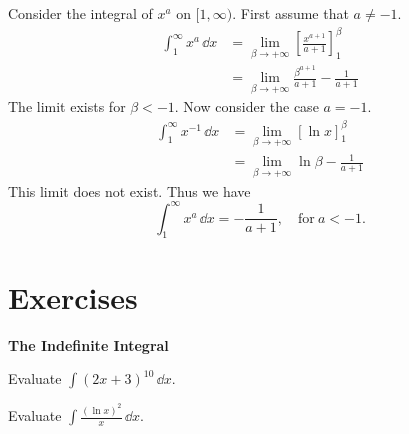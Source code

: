 \begin{Example}
  Consider the integral of $x^a$ on $[1,\infty)$.  First assume that
  $a \neq -1$.
  \begin{align*}
    \int_1^\infty x^a \,\dd x
    &= \lim_{\beta \to +\infty} \left[ \frac{x^{a+1}}{a+1} 
    \right]_1^\beta \\
    &= \lim_{\beta \to +\infty} \frac{\beta^{a+1}}{a+1} - \frac{1}{a+1}
  \end{align*}
  The limit exists for $\beta < -1$.  Now consider the case $a = -1$.
  \begin{align*}
    \int_1^\infty x^{-1} \,\dd x
    &= \lim_{\beta \to +\infty} \left[ \ln x
    \right]_1^\beta \\
    &= \lim_{\beta \to +\infty} \ln \beta - \frac{1}{a+1}
  \end{align*}
  This limit does not exist.  Thus we have 
  \[
  \int_1^\infty x^a \,\dd x = - \frac{1}{a+1}, \quad \mathrm{for}\ a < -1.
  \]
\end{Example}









\raggedbottom
\pagebreak
\flushbottom
\section{Exercises}



\begin{large}
  \noindent
  \textbf{The Indefinite Integral}
\end{large}


\begin{Exercise}
  \label{exercise int 2x+3 10}
  Evaluate $\int (2x+3)^{10} \,\dd x$.

\end{Exercise}




\begin{Exercise}
  \label{exercise int ln x 2 / x}
  Evaluate $\int \frac{(\ln x)^2}{x} \,\dd x$.

\end{Exercise}



